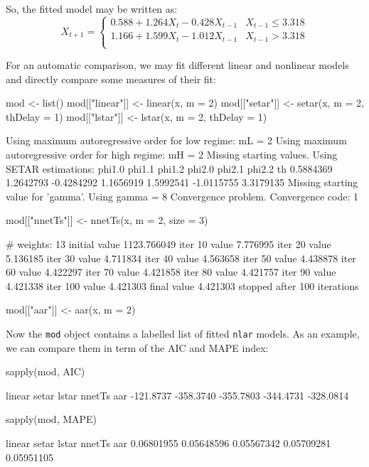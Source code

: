 \documentclass[a4paper]{article}
\begin{document}
So, the fitted model may be written as:
\[
X_{t+1} = \left\{\begin{array}{lr}
0.588 + 1.264 X_{t} -0.428 X_{t-1} & X_{t-1} \leq 3.318 \\
1.166 + 1.599 X_{t} -1.012 X_{t-1} & X_{t-1} > 3.318 \\
\end{array}\right.
\]

For an automatic comparison, we may fit different linear and nonlinear models and directly compare some measures of their fit:
\begin{Schunk}
\begin{Sinput}
 mod <- list()
 mod[["linear"]] <- linear(x, m = 2)
 mod[["setar"]] <- setar(x, m = 2, thDelay = 1)
 mod[["lstar"]] <- lstar(x, m = 2, thDelay = 1)
\end{Sinput}
\begin{Soutput}
Using maximum autoregressive order for low regime: mL = 2 
Using maximum autoregressive order for high regime: mH = 2 
Missing starting values. Using SETAR estimations:
    phi1.0     phi1.1     phi1.2     phi2.0     phi2.1     phi2.2         th 
 0.5884369  1.2642793 -0.4284292  1.1656919  1.5992541 -1.0115755  3.3179135 
Missing starting value for 'gamma'. Using gamma =  8 
Convergence problem. Convergence code:  1 
\end{Soutput}
\begin{Sinput}
 mod[["nnetTs"]] <- nnetTs(x, m = 2, size = 3)
\end{Sinput}
\begin{Soutput}
# weights:  13
initial  value 1123.766049 
iter  10 value 7.776995
iter  20 value 5.136185
iter  30 value 4.711834
iter  40 value 4.563658
iter  50 value 4.438878
iter  60 value 4.422297
iter  70 value 4.421858
iter  80 value 4.421757
iter  90 value 4.421338
iter 100 value 4.421303
final  value 4.421303 
stopped after 100 iterations
\end{Soutput}
\begin{Sinput}
 mod[["aar"]] <- aar(x, m = 2)
\end{Sinput}
\end{Schunk}

Now the \texttt{mod} object contains a labelled list of fitted \texttt{nlar} models.
As an example, we can compare them in term of the AIC and MAPE index:
\begin{Schunk}
\begin{Sinput}
 sapply(mod, AIC)
\end{Sinput}
\begin{Soutput}
   linear     setar     lstar    nnetTs       aar 
-121.8737 -358.3740 -355.7803 -344.4731 -328.0814 
\end{Soutput}
\begin{Sinput}
 sapply(mod, MAPE)
\end{Sinput}
\begin{Soutput}
    linear      setar      lstar     nnetTs        aar 
0.06801955 0.05648596 0.05567342 0.05709281 0.05951105 
\end{Soutput}
\end{Schunk}
\end{document}
